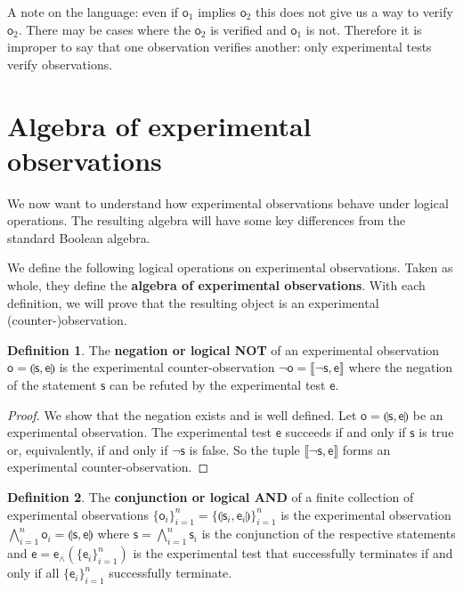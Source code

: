 \documentclass[review]{elsarticle}
\theoremstyle{plain}%
\theoremstyle{definition}
\newtheorem{defn}{Definition}[section]
\theoremstyle{remark}
\begin{document}
A note on the language: even if $\mathsf{o}_1$ implies $\mathsf{o}_2$ this does not give us a way to verify $\mathsf{o}_2$. There may be cases where the $\mathsf{o}_2$ is verified and $\mathsf{o}_1$ is not. Therefore it is improper to say that one observation verifies another: only experimental tests verify observations.




\section{Algebra of experimental observations}

We now want to understand how experimental observations behave under logical operations. The resulting algebra will have some key differences from the standard Boolean algebra.





We define the following logical operations on experimental observations. Taken as whole, they define the \textbf{algebra of experimental observations}. With each definition, we will prove that the resulting object is an experimental (counter-)observation. 

\begin{defn}
	The \textbf{negation or logical NOT} of an experimental observation $\mathsf{o}=\llparenthesis \mathsf{s}, \mathsf{e}\rrparenthesis$ is the experimental counter-observation $\neg \mathsf{o}=\llbracket\neg \mathsf{s}, \mathsf{e}\rrbracket$ where the negation of the statement $\mathsf{s}$ can be refuted by the experimental test $\mathsf{e}$.
\end{defn}

\begin{proof}
	We show that the negation exists and is well defined. Let $\mathsf{o}=\llparenthesis \mathsf{s}, \mathsf{e}\rrparenthesis$ be an experimental observation. The experimental test $\mathsf{e}$ succeeds if and only if $\mathsf{s}$ is true or, equivalently, if and only if $\neg \mathsf{s}$ is false. So the tuple $\llbracket\neg \mathsf{s}, \mathsf{e}\rrbracket$ forms an experimental counter-observation.
\end{proof}

\begin{defn}
	The \textbf{conjunction or logical AND} of a finite collection  of experimental observations $\{\mathsf{o}_i\}_{i=1}^{n}=\{\llparenthesis \mathsf{s}_i, \mathsf{e}_i\rrparenthesis\}_{i=1}^{n}$ is the experimental observation $\bigwedge\limits_{i=1}^{n} \mathsf{o}_i = \llparenthesis \mathsf{s}, \mathsf{e}\rrparenthesis$ where $\mathsf{s} = \bigwedge\limits_{i=1}^{n} \mathsf{s}_i$ is the conjunction of the respective statements and $\mathsf{e} = \mathsf{e}_\wedge(\{\mathsf{e}_i\}_{i=1}^{n})$ is the experimental test that successfully terminates if and only if all $\{\mathsf{e}_i\}_{i=1}^{n}$ successfully terminate.
\end{defn}
\end{document}
